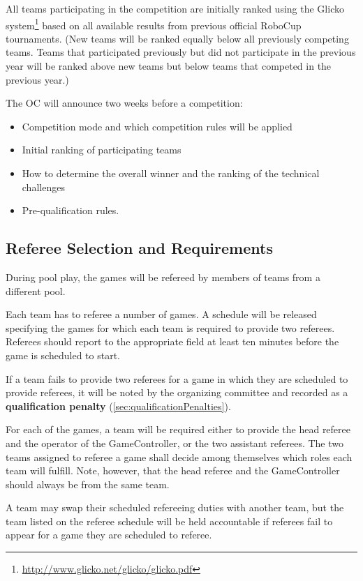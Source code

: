 All teams participating in the competition are initially ranked using the Glicko system\footnote{\url{http://www.glicko.net/glicko/glicko.pdf}} based on all available results from previous official RoboCup tournaments.
(New teams will be ranked equally below all previously competing teams.
Teams that participated previously but did not participate in the previous year will be ranked above new teams but below teams that competed in the previous year.)

The OC will announce two weeks before a competition:
\begin{itemize}
  \item Competition mode and which competition rules will be applied
  \item Initial ranking of participating teams
  \item How to determine the overall winner and the ranking of the technical challenges
  \item Pre-qualification rules.
\end{itemize}

\subsection{Referee Selection and Requirements}
\label{sec:refSelection}

During pool play, the games will be refereed by members of teams from a different pool.

Each team has to referee a number of games.
A schedule will be released specifying the games for which each team is required to provide two referees.
Referees should report to the appropriate field at least ten minutes before the game is scheduled to start.

If a team fails to provide two referees for a game in which they are scheduled to provide referees, it will be noted by the organizing committee and recorded as a \textbf{qualification penalty} (\cref{sec:qualificationPenalties}).

For each of the games, a team will be required either to provide the head referee and the operator of the GameController, or the two assistant referees.
The two teams assigned to referee a game shall decide among themselves which roles each team will fulfill.
Note, however, that the head referee and the GameController should always be from the same team.

A team may swap their scheduled refereeing duties with another team, but the team listed on the referee schedule will be held accountable if referees fail to appear for a game they are scheduled to referee.

